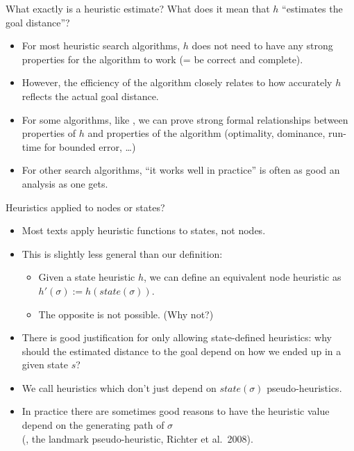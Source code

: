 \documentclass{gkibeamer}
\begin{document}
\begin{frame}{What exactly is a heuristic estimate?}
  What does it mean that $h$ ``estimates the goal distance''?
  \begin{itemize}
  \item For most heuristic search algorithms, $h$ does not need to
    have any strong properties for the algorithm to work (= be
    correct and complete).
  \item However, the \alert{efficiency} of the algorithm closely
    relates to how accurately $h$ reflects the actual goal distance.
  \item For some algorithms, like \astar, we can prove strong formal
    relationships between properties of $h$ and properties of the
    algorithm (optimality, dominance, run-time for bounded error,
    \dots)
  \item For other search algorithms, ``it works well in practice'' is
    often as good an analysis as one gets.
  \end{itemize}
\end{frame}

\begin{frame}{Heuristics applied to nodes or states?}
  \begin{itemize}
  \item Most texts apply heuristic functions to \alert{states}, not
    \alert{nodes}.
  \item This is slightly \alert{less general} than our definition:
    \begin{itemize}
    \item Given a state heuristic $h$, we can define an
      equivalent node heuristic as $h'(\sigma) :=
      h(\textit{state}(\sigma))$.
    \item The opposite is not possible. (Why not?)
    \end{itemize}
  \item There is good justification for only allowing state-defined
    heuristics: why should the estimated distance to the goal depend
    on \alert{how} we ended up in a given state $s$?
  \item We call heuristics which don't just depend on
    $\textit{state}(\sigma)$ \alert{pseudo-heuristics}.
  \item In practice there are sometimes good reasons to have the
    heuristic value depend on the generating path of $\sigma$ \\
    (\eg, the \alert{landmark pseudo-heuristic}, Richter et al.\ 2008).
  \end{itemize}
\end{frame}
\end{document}
